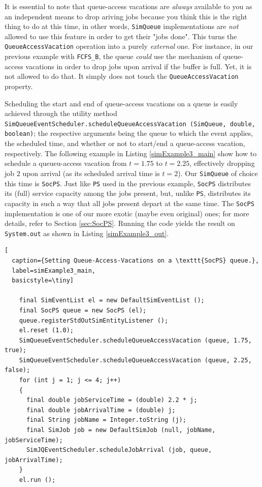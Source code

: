 It is essential to note that queue-access vacations
  are {\em always\/} available to you
  as an independent means to drop ariving jobs
  because you think this is the right thing to do at this time,
  in other words,
  \lstinline|SimQueue| implementations
  are {\em not\/} allowed to use this feature
  in order to get their "jobs done".
This turns the \lstinline|QueueAccessVacation|
  operation into a purely {\em external\/} one.
For instance,
  in our previous example with \lstinline|FCFS_B|,
  the queue {\em could\/} use the mechanism
  of queue-access vacations in order to
  drop jobs upon arrival if the buffer is full.
Yet, it is not allowed to do that.
It simply does not touch the \lstinline|QueueAccessVacation| property.

Scheduling the start and end of queue-access vacations on a queue
  is easily achieved through the utility method
  \lstinline|SimQueueEventScheduler.scheduleQueueAccessVacation (SimQueue, double, boolean)|;
  the respective arguments being the queue to which the event applies,
  the scheduled time,
  and whether or not to start/end a queue-access vacation,
  respectively.
The following example in Listing \ref{simExample3_main}
  show how to schedule a queueu-access vacation from
  $t=1.75$ to $t=2.25$, effectively dropping job $2$
  upon arrival (as its scheduled arrival time is $t=2$).
Our \lstinline|SimQueue| of choice this time is \lstinline|SocPS|.
Just like \lstinline|PS| used in the previous example,
  \lstinline|SocPS| distributes its (full) service capacity
  among the jobs present,
  but, unlike \lstinline|PS|,
  distributes its capacity in such a way that all
  jobs present depart at the same time.
The \lstinline|SocPS| implementation
  is one of our more exotic (maybe even original) ones;
  for more details,
  refer to Section \ref{sec:SocPS}.
Running the code yields the result on \lstinline|System.out|
  as shown in Listing \ref{simExample3_out}.

\begin{lstfloat}
\begin{lstlisting}[
  caption={Setting Queue-Access-Vacations on a \texttt{SocPS} queue.},
  label=simExample3_main,
  basicstyle=\tiny]

    final SimEventList el = new DefaultSimEventList ();
    final SocPS queue = new SocPS (el);
    queue.registerStdOutSimEntityListener ();
    el.reset (1.0);
    SimQueueEventScheduler.scheduleQueueAccessVacation (queue, 1.75, true);
    SimQueueEventScheduler.scheduleQueueAccessVacation (queue, 2.25, false);
    for (int j = 1; j <= 4; j++)
    {
      final double jobServiceTime = (double) 2.2 * j;
      final double jobArrivalTime = (double) j;
      final String jobName = Integer.toString (j);
      final SimJob job = new DefaultSimJob (null, jobName, jobServiceTime);
      SimJQEventScheduler.scheduleJobArrival (job, queue, jobArrivalTime);
    }
    el.run ();

\end{lstlisting}
\end{lstfloat}
  
